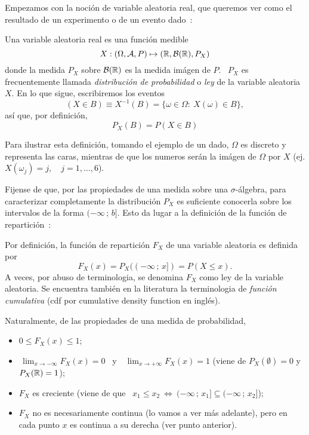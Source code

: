 Empezamos con la  noci\'on de variable aleatoria real, que  queremos ver como el
resultado de un experimento o de un evento dado~\cite{AthLah06, Coh13, Bre88}:
%
\begin{definicion}
  Una variable aleatoria real es una funci\'on medible
  \[
  X: (\Omega,\mathcal{A},P) \mapsto (\mathbb{R},\mathcal{B}(\mathbb{R}),P_X)
  \]
  donde la medida  $P_X$ sobre $\mathcal{B}(\mathbb{R})$ es la medida im\'agen  de $P$.  \ $P_X$
  es frecuentemente llamada {\it distribuci\'on  de probabilidad} o {\it ley} de
  la variable aleatoria $X$. En lo que sigue, escribiremos los eventos
  \[
  (X \in B) \equiv X^{-1}(B) = \{ \omega \in \Omega: \: X(\omega) \in B \},
  \]
  as\'i que, por definici\'on,
  \[
  P_X(B) = P(X \in B)
  \]
\end{definicion}
%
Para  ilustrar esta definici\'on,  tomando el  ejemplo de  un dado,  $\Omega$ es
discreto y representa  las caras, mientras de que los  numeros ser\'an la im\'agen
de $\Omega$ por $X$ (ej. $X(\omega_j) = j, \quad j = 1, \ldots , 6$).

Fijense de que, por las  propiedades de una medida sobre una $\sigma$-\'algebra,
para caracterizar completamente la  distribuci\'on $P_X$ es suficiente conocerla
sobre  los intervalos de  la forma  $(-\infty \,  ; \,  b]$. Esto  da lugar  a la
definici\'on  de  la funci\'on  de  repartici\'on~\cite{AthLah06, Coh13,  Bre88,
  HogMck13}:
%
\begin{definicion}
  Por  definici\'on,  la  funci\'on  de  repartici\'on  $F_X$  de  una  variable
  aleatoria es definida por
  \[
  F_X(x) = P_X((-\infty \, ; \, x]) = P(X \le x).
  \]
  A veces, por abuso de terminologia,  se denomina $F_X$ como ley de la variable
  aleatoria. Se  encuentra tambi\'en  en la literatura  la terminologia  de {\it
    funci\'on cumulativa} (cdf por cumulative density function en ingl\'es).
\end{definicion}
%
Naturalmente, de las propiedades de una medida de probabilidad,
%
\begin{itemize}
\item $0 \le F_X(x) \le 1$;
%
\item $\displaystyle \, \lim_{x \to -\infty} F_X(x) = 0$ \ y \ $\displaystyle \,
  \lim_{x \to +\infty} F_X(x) = 1$  (viene de $P_X(\emptyset) = 0$ y $P_X(\mathbb{R})
  = 1$);
%
\item  $F_X$ es creciente  \big(viene de  que \  $x_1 \le  x_2 \:  \Leftrightarrow \:
  (-\infty \, ; \, x_1] \subseteq (-\infty \, ; \, x_2]$\big);
%
\item $F_X$ no es necesariamente continua  (lo vamos a ver m\'as adelante), pero
  en cada punto $x$ es continua a su derecha (ver punto anterior).
\end{itemize}


